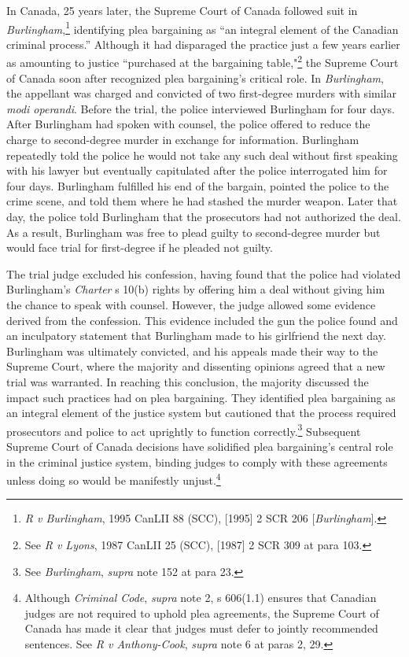 In Canada, 25 years later, the Supreme Court of Canada followed suit in \textit{Burlingham},\footnote{\textit{R v Burlingham}, 1995 CanLII 88 (SCC), [1995] 2 SCR 206 [\textit{Burlingham}].} identifying plea bargaining as ``an integral element of the Canadian criminal process.'' Although it had disparaged the practice just a few years earlier as amounting to justice ``purchased at the bargaining table,"\footnote{See \textit{R v Lyons}, 1987 CanLII 25 (SCC), [1987] 2 SCR 309 at para 103.} the Supreme Court of Canada soon after recognized plea bargaining's critical role. In \textit{Burlingham}, the appellant was charged and convicted of two first-degree murders with similar \textit{modi operandi}. Before the trial, the police interviewed Burlingham for four days. After Burlingham had spoken with counsel, the police offered to reduce the charge to second-degree murder in exchange for information. Burlingham repeatedly told the police he would not take any such deal without first speaking with his lawyer but eventually capitulated after the police interrogated him for four days. Burlingham fulfilled his end of the bargain, pointed the police to the crime scene, and told them where he had stashed the murder weapon. Later that day, the police told Burlingham that the prosecutors had not authorized the deal. As a result, Burlingham was free to plead guilty to second-degree murder but would face trial for first-degree if he pleaded not guilty.

The trial judge excluded his confession, having found that the police had violated Burlingham's \textit{Charter} s 10(b) rights by offering him a deal without giving him the chance to speak with counsel. However, the judge allowed some evidence derived from the confession. This evidence included the gun the police found and an inculpatory statement that Burlingham made to his girlfriend the next day. Burlingham was ultimately convicted, and his appeals made their way to the Supreme Court, where the majority and dissenting opinions agreed that a new trial was warranted. In reaching this conclusion, the majority discussed the impact such practices had on plea bargaining. They identified plea bargaining as an integral element of the justice system but cautioned that the process required prosecutors and police to act uprightly to function correctly.\footnote{See \textit{Burlingham}, \textit{supra} note 152 at para 23.} Subsequent Supreme Court of Canada decisions have solidified plea bargaining's central role in the criminal justice system, binding judges to comply with these agreements unless doing so would be manifestly unjust.\footnote{Although \textit{Criminal Code}, \textit{supra} note 2, s 606(1.1) ensures that Canadian judges are not required to uphold plea agreements, the Supreme Court of Canada has made it clear that judges must defer to jointly recommended sentences. See \textit{R v Anthony-Cook}, \textit{supra} note 6 at paras 2, 29.}

